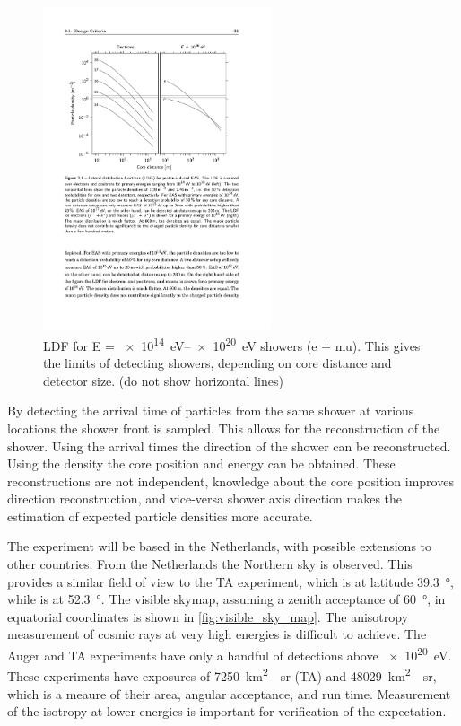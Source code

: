 \begin{figure}
    \centering
    \includegraphics[width=0.6\textwidth]
                    {plots/experiment/ldf_energies}
    \caption{LDF for E = \SIrange{e14}{e20}{\eV} showers (e + mu). This gives the limits of detecting showers, depending on core distance and detector size. (do not show horizontal lines)}
    \label{fig:ldf_energies}
\end{figure}

By detecting the arrival time of particles from the same shower at various locations the shower front is sampled. This allows for the reconstruction of the shower. Using the arrival times the direction of the shower can be reconstructed. Using the density the core position and energy can be obtained. These reconstructions are not independent, knowledge about the core position improves direction reconstruction, and vice-versa shower axis direction makes the estimation of expected particle densities more accurate.

The experiment will be based in the Netherlands, with possible extensions to other countries. From the Netherlands the Northern sky is observed. This provides a similar field of view to the TA experiment, which is at latitude \SI{39.3}{\degree}, while \nikhef is at \SI{52.3}{\degree}. The visible skymap, assuming a zenith acceptance of \SI{60}{\degree}, in equatorial coordinates is shown in \cref{fig:visible_sky_map}. The anisotropy measurement of cosmic rays at very high energies is difficult to achieve. The Auger and TA experiments have only a handful of detections above \SI{e20}{\eV}. These experiments have exposures of \SI{7250}{\kilo\meter\squared\year\steradian} (TA) and \SI{48029}{\kilo\meter\squared\year\steradian}, which is a meaure of their area, angular acceptance, and run time. Measurement of the isotropy at lower energies is important for verification of the expectation.

